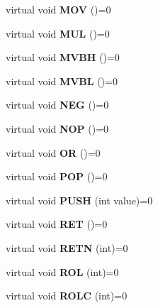 \begin{DoxyCompactItemize}
\item 
virtual void {\bfseries M\+O\+V} ()=0\label{classcdk_1_1basic__postfix__emitter_a4480ffe2d77a5ac4f8502be600ac08d3}

\item 
virtual void {\bfseries M\+U\+L} ()=0\label{classcdk_1_1basic__postfix__emitter_a1b4edc79e9074688feb51609f1b8137b}

\item 
virtual void {\bfseries M\+V\+B\+H} ()=0\label{classcdk_1_1basic__postfix__emitter_a584fefb1f335e4b9ba04b8844cdc3e21}

\item 
virtual void {\bfseries M\+V\+B\+L} ()=0\label{classcdk_1_1basic__postfix__emitter_ae60e5813a739d43884be425baf152f72}

\item 
virtual void {\bfseries N\+E\+G} ()=0\label{classcdk_1_1basic__postfix__emitter_abcf3ea8d995b9c898e8b97920c1f3d19}

\item 
virtual void {\bfseries N\+O\+P} ()=0\label{classcdk_1_1basic__postfix__emitter_a8b45caa490a5b0aef1aa2a25cd3a163e}

\item 
virtual void {\bfseries O\+R} ()=0\label{classcdk_1_1basic__postfix__emitter_a8bffc779f5bc6b0878adc68aa19763f8}

\item 
virtual void {\bfseries P\+O\+P} ()=0\label{classcdk_1_1basic__postfix__emitter_a87f4067fc2c1fc7e5cb4676a0cd691e5}

\item 
virtual void {\bfseries P\+U\+S\+H} (int value)=0\label{classcdk_1_1basic__postfix__emitter_ae330fba22afd103ef31ec578b3044064}

\item 
virtual void {\bfseries R\+E\+T} ()=0\label{classcdk_1_1basic__postfix__emitter_a80e164209c2b470c46040e12c8c796b2}

\item 
virtual void {\bfseries R\+E\+T\+N} (int)=0\label{classcdk_1_1basic__postfix__emitter_a49d4847065b9b9c8364949b5d07e62f1}

\item 
virtual void {\bfseries R\+O\+L} (int)=0\label{classcdk_1_1basic__postfix__emitter_aeede745ec6d7d8a06226ccbaecfc3a21}

\item 
virtual void {\bfseries R\+O\+L\+C} (int)=0\label{classcdk_1_1basic__postfix__emitter_aa34bacf7cb787b8be7bed0a73e55ec64}


\end{DoxyCompactItemize}
